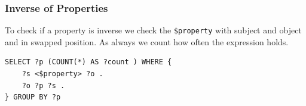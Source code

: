 \subsubsection*{Inverse of Properties}
To check if a property is inverse we check the \texttt{\$property} with subject
and object and in swapped position. As always we count how often the expression
holds.
\begin{lstlisting} 
SELECT ?p (COUNT(*) AS ?count ) WHERE {
	?s <$property> ?o .
	?o ?p ?s .
} GROUP BY ?p
\end{lstlisting}



